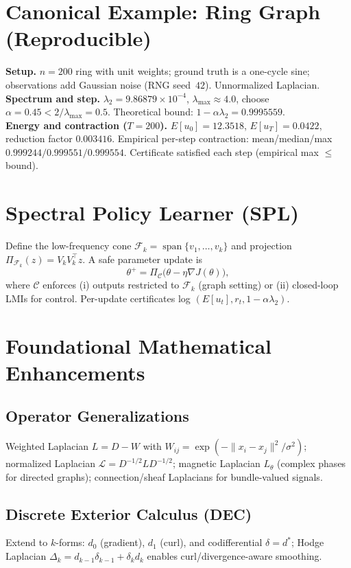 \documentclass[11pt]{article}
\begin{document}
\section{Canonical Example: Ring Graph (Reproducible)}
\textbf{Setup.} $n=200$ ring with unit weights; ground truth is a one-cycle sine; observations add Gaussian noise (RNG seed~$42$). Unnormalized Laplacian.
\\\textbf{Spectrum and step.} $\lambda_2 = 9.86879\times 10^{-4}$, $\lambda_{\max}\approx 4.0$, choose $\alpha = 0.45 < 2/\lambda_{\max} = 0.5$. Theoretical bound: $1-\alpha\lambda_2 = 0.9995559$.
\\\textbf{Energy and contraction ($T=200$).} $E[u_0]=12.3518$, $E[u_T]=0.0422$, reduction factor $0.003416$. Empirical per-step contraction: mean/median/max $0.999244/0.999551/0.999554$. Certificate satisfied each step (empirical max $\le$ bound).

\section{Spectral Policy Learner (SPL)}
Define the low-frequency cone $\mathcal F_k=\operatorname{span}\{v_1,\dots,v_k\}$ and projection $\Pi_{\mathcal F_k}(z)=V_kV_k^\top z$. A safe parameter update is
\begin{equation}
\theta^+=\Pi_{\mathcal C}\big(\theta-\eta\nabla J(\theta)\big),
\end{equation}
where $\mathcal C$ enforces (i) outputs restricted to $\mathcal F_k$ (graph setting) or (ii) closed-loop LMIs for control. Per-update certificates log $(E[u_t], r_t, 1-\alpha\lambda_2)$.

\section{Foundational Mathematical Enhancements}
\subsection{Operator Generalizations}
Weighted Laplacian $L=D-W$ with $W_{ij}=\exp(-\|x_i-x_j\|^2/\sigma^2)$; normalized Laplacian $\mathcal L=D^{-1/2}LD^{-1/2}$; magnetic Laplacian $L_\theta$ (complex phases for directed graphs); connection/sheaf Laplacians for bundle-valued signals.
\subsection{Discrete Exterior Calculus (DEC)}
Extend to $k$-forms: $d_0$ (gradient), $d_1$ (curl), and codifferential $\delta=d^*$; Hodge Laplacian $\Delta_k=d_{k-1}\delta_{k-1}+\delta_k d_k$ enables curl/divergence-aware smoothing.
\end{document}
